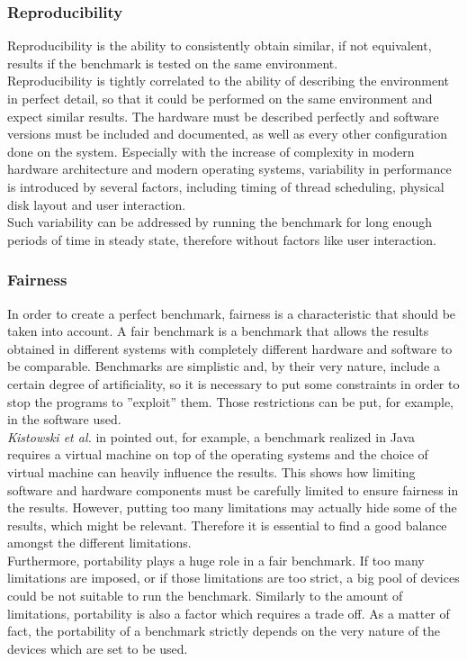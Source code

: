\subsubsection{Reproducibility}
Reproducibility is the ability to consistently obtain similar, if not equivalent, results if the benchmark is tested on the same environment. \cite{how_to_bench}\\
Reproducibility is tightly correlated to the ability of describing the environment in perfect detail, so that it could be performed on the same environment and expect similar results. The hardware must be described perfectly and software versions must be included and documented, as well as every other configuration done on the system. Especially with the increase of complexity in modern hardware architecture and modern operating systems, variability in performance is introduced by several factors, including  timing of thread scheduling, physical disk layout and  user interaction. \cite{how_to_bench}\\
Such variability can be addressed by running the benchmark for long enough periods of time in steady state, therefore without factors like user interaction. 


\subsubsection{Fairness}
In order to create a perfect benchmark, fairness is a characteristic that should be taken into account. A fair benchmark is a benchmark that allows the results obtained in different systems with completely different hardware and software to be comparable. Benchmarks are simplistic and, by their very nature, include a certain degree of artificiality, so it is necessary to put some constraints in order to stop the programs to ''exploit'' them. Those restrictions can be put, for example, in the software used.\\ 
\textit{Kistowski et al.} in \cite{how_to_bench} pointed out, for example, a benchmark realized in Java requires a virtual machine on top of the operating systems and the choice of virtual machine can heavily influence the results. This shows how limiting software and hardware components must be carefully limited to ensure fairness in the results. However, putting too many limitations may actually hide some of the results, which might be relevant. \cite{how_to_bench} Therefore it is essential to find a good balance amongst the different limitations. \\
Furthermore, portability plays a huge role in a fair benchmark. If too many limitations are imposed, or if those limitations are too strict, a big pool of devices could be not suitable to run the benchmark. Similarly to the amount of limitations, portability is also a factor which requires a trade off. As a matter of fact, the portability of a benchmark strictly depends on the very nature of the devices which are set to be used. 

